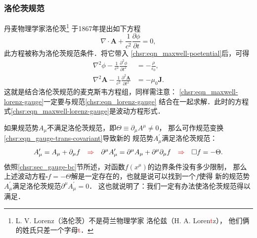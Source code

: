  

\subsubsection{洛伦茨规范}
丹麦物理学家洛伦茨{\footnote{L. V. Lorenz（洛伦茨）不是荷兰物理学家
		洛伦兹（H. A. Loren{\textcolor{red}{t}}z），
		他们俩的姓氏只差一个字母{\textcolor{red}{t}}．}}
于1867年提出如下方程
\begin{equation}\label{chsr:eqn_lorenz-gauge}
	{\nabla  \cdot \boldsymbol{A} + \frac{1}{c^2}\frac{ \partial \phi }{ \partial t}}  = 0,
\end{equation}
此方程被称为洛伦茨规范条件．将它带入
\eqref{chsr:eqn_maxwell-poetential}后，可得
\begin{subequations}\label{chsr:eqn_maxwell-lorenz-gauge}
	\begin{align}
		{\nabla ^2}\phi  - \frac{1}{c^2}\frac{\partial^2 \phi}{\partial t^2}
		&=  - \frac{\rho}{\epsilon _0}, \label{chsr:eqn_gauss-e-lorenz-gauge} \\
		{\nabla ^2}\boldsymbol{A} - \frac{1}{c^2}\frac{\partial ^2\boldsymbol{A}}{\partial {t^2}}
		&=  - {\mu _0}\boldsymbol{J}. \label{chsr:eqn_amp-max-lorenz-gauge}
	\end{align}
\end{subequations}
这就是结合洛伦茨规范的麦克斯韦方程组，同样需注意：
\eqref{chsr:eqn_maxwell-lorenz-gauge}一定要与规范\eqref{chsr:eqn_lorenz-gauge}
结合在一起求解．此时的方程式\eqref{chsr:eqn_maxwell-lorenz-gauge}是波动方程形式．


如果规范势$A_\mu$不满足洛伦茨规范，即$\Theta \equiv \partial_\mu A^\mu \neq 0$，
那么可作规范变换\eqref{chsr:eqn_gauge-trans-covariant}导致新的
规范势$A^{\prime}_{\mu}$满足洛伦茨规范：
\begin{equation}
	A^{\prime}_{\mu} = A_\mu + \partial_\mu f {\quad\color{red}\Rightarrow\quad}
	\partial^\mu A^{\prime}_{\mu} = \partial^\mu A_\mu + \partial^\mu\partial_\mu f
	{\quad\color{red}\Rightarrow\quad} \square f = - \Theta .
\end{equation}
依照\ref{chsr:sec_gauge-bc}节所述，对函数$f({x^\mu})$的边界条件没有多少限制，
那么上述波动方程$\square f = - \Theta$解是一定存在的，也就是说可以找到一个$f$使得
新的规范势$A^{\prime}_{\mu}$满足洛伦茨规范$\partial^\mu A^{\prime}_{\mu}=0$．
这也就说明了：我们一定有办法使洛伦茨规范得以满足．


